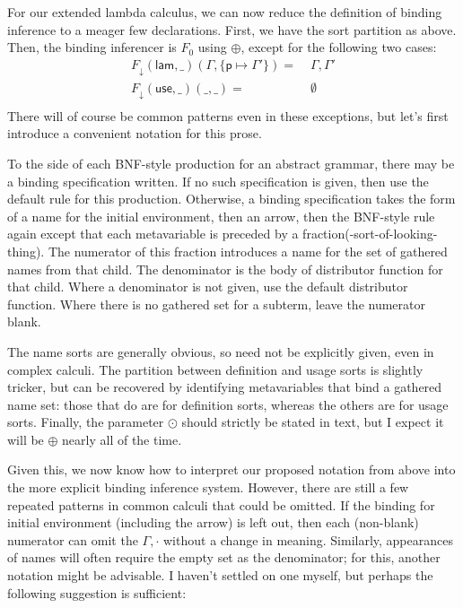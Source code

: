 \documentclass[11pt]{article} %
\theoremstyle{definition}
\begin{document}
For our extended lambda calculus, we can now reduce the definition of binding inference to a meager few declarations.
First, we have the sort partition as above.
Then, the binding inferencer is $F_0$ using $\oplus$, except for the following two cases:
\begin{align*}
F_\downarrow(\mathsf{lam}, \_)(\Gamma, \{\mathsf{p} \mapsto \Gamma'\}) =\;& \Gamma,\Gamma' \\
F_\downarrow(\mathsf{use}, \_)(\_, \_) =\;& \emptyset \\
\end{align*}
There will of course be common patterns even in these exceptions, but let's first introduce a convenient notation for this prose.

To the side of each BNF-style production for an abstract grammar, there may be a binding specification written.
If no such specification is given, then use the default rule for this production.
Otherwise, a binding specification takes the form of a name for the initial environment, then an arrow, then the BNF-style rule again except that each metavariable is preceded by a fraction(-sort-of-looking-thing).
The numerator of this fraction introduces a name for the set of gathered names from that child.
The denominator is the body of distributor function for that child.
Where a denominator is not given, use the default distributor function.
Where there is no gathered set for a subterm, leave the numerator blank.

The name sorts are generally obvious, so need not be explicitly given, even in complex calculi.
The partition between definition and usage sorts is slightly tricker, but can be recovered by identifying metavariables that bind a gathered name set: those that do are for definition sorts, whereas the others are for usage sorts.
Finally, the parameter $\odot$ should strictly be stated in text, but I expect it will be $\oplus$ nearly all of the time.

Given this, we now know how to interpret our proposed notation from above into the more explicit binding inference system.
However, there are still a few repeated patterns in common calculi that could be omitted.
If the binding for initial environment (including the arrow) is left out, then each (non-blank) numerator can omit the $\Gamma,\cdot$ without a change in meaning.
Similarly, appearances of names will often require the empty set as the denominator; for this, another notation might be advisable.
I haven't settled on one myself, but perhaps the following suggestion is sufficient:
\end{document}
